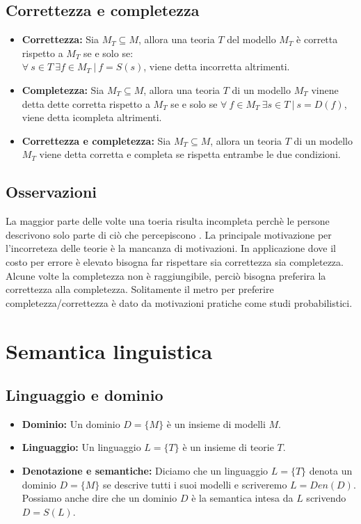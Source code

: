 \documentclass{book}
\newcommand{\spazio}{\vspace{1em} \newline}
\begin{document}
    \subsection{Correttezza e completezza}
    \begin{itemize}
        \item \textbf{Correttezza:} Sia $M_T \subseteq M$, allora una teoria $T$ del modello $M_T$ è corretta rispetto a $M_T$ se e solo se:\\
            $\forall\ s \in T\ \exists f \in M_T\ |\ f=S(s)$, viene detta incorretta altrimenti.
        \item \textbf{Completezza:} Sia $M_T \subseteq M$, allora una teoria $T$ di un modello $M_T$ vinene detta dette corretta rispetto a $M_T$ se e solo se $\forall\ f \in M_T\ \exists s \in T\ |\ s=D(f)$, viene detta icompleta altrimenti.
        \item \textbf{Correttezza e completezza:} Sia $M_T \subseteq M$, allora un teoria $T$ di un modello $M_T$ viene detta corretta e completa se rispetta entrambe le due condizioni.
    \end{itemize}

    \subsection{Osservazioni}
    La maggior parte delle volte una toeria risulta incompleta perchè le persone descrivono solo parte di ciò che percepiscono .
    \spazio
    La principale motivazione per l'incorreteza delle teorie è la mancanza di motivazioni.
    \spazio
    In applicazione dove il costo per errore è elevato bisogna far rispettare sia correttezza sia completezza.
    \space
    Alcune volte la completezza non è raggiungibile, perciò bisogna preferira la correttezza alla completezza.
    \space
    Solitamente il metro per preferire completezza/correttezza è dato da motivazioni pratiche come studi probabilistici.

    \section{Semantica linguistica}
    \subsection{Linguaggio e dominio}
    \begin{itemize}
        \item \textbf{Dominio:} Un dominio $D=\{M\}$ è un insieme di modelli $M$.
        \item \textbf{Linguaggio:} Un linguaggio $L=\{T\}$ è un insieme di teorie $T$.
        \item \textbf{Denotazione e semantiche:}  Diciamo che un linguaggio $L=\{T\}$ denota un dominio $D=\{M\}$ se descrive tutti i suoi modelli e scriveremo $L=Den(D)$.\\
            Possiamo anche dire che un dominio $D$ è la semantica intesa da $L$ scrivendo $D=S(L)$.
    \end{itemize}
\end{document}
